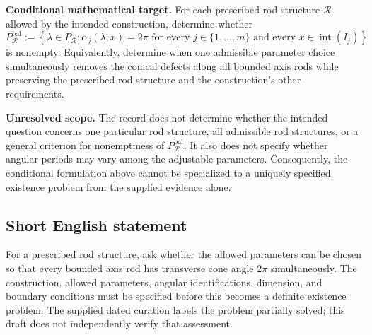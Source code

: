 \documentclass[11pt]{article}
\begin{document}
\textbf{Conditional mathematical target.} For each prescribed rod structure \(\mathcal R\) allowed by the intended construction, determine whether
\[
P_{\mathcal R}^{\mathrm{bal}}
 :=\left\{\lambda\in P_{\mathcal R}:
 \alpha_j(\lambda,x)=2\pi
 \text{ for every }j\in\{1,\ldots,m\}
 \text{ and every }x\in\operatorname{int}(I_j)
 \right\}
\]
is nonempty. Equivalently, determine when one admissible parameter choice simultaneously removes the conical defects along all bounded axis rods while preserving the prescribed rod structure and the construction's other requirements.

\textbf{Unresolved scope.} The record does not determine whether the intended question concerns one particular rod structure, all admissible rod structures, or a general criterion for nonemptiness of \(P_{\mathcal R}^{\mathrm{bal}}\). It also does not specify whether angular periods may vary among the adjustable parameters. Consequently, the conditional formulation above cannot be specialized to a uniquely specified existence problem from the supplied evidence alone.
\subsection{Short English statement}
For a prescribed rod structure, ask whether the allowed parameters can be chosen so that every bounded axis rod has transverse cone angle \(2\pi\) simultaneously. The construction, allowed parameters, angular identifications, dimension, and boundary conditions must be specified before this becomes a definite existence problem. The supplied dated curation labels the problem partially solved; this draft does not independently verify that assessment.
\end{document}
